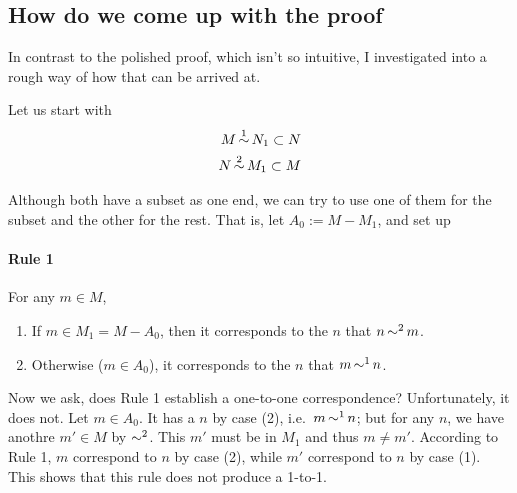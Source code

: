 \subsection{How do we come up with the proof}
In contrast to the polished proof, which isn't so intuitive, I investigated
into a rough way of how that can be arrived at.

Let us start with 
\begin{align*}
M \operatorname*{\sim}^1 N_1 \subset N \\
N \operatorname*{\sim}^2 M_1 \subset M
\end{align*}

Although both have a subset as one end, we can try to use one of them for the
subset and the other for the rest. That is, let $A_0 := M-M_1$, and set up

\paragraph{Rule 1}
For any $m \in M$,
\begin{enumerate}
	\item If $m \in M_1 = M-A_0$, then it corresponds to the $n$ that $n
		\operatorname*{\sim}^2 m$.
	\item Otherwise ($m \in A_0$), it corresponds to the $n$ that $m \operatorname*{\sim}^1
		n$.
\end{enumerate}

Now we ask, does Rule 1 establish a one-to-one correspondence? Unfortunately,
it does not. Let $m \in A_0$. It has a $n$ by case (2), i.e.\ $m \operatorname*{\sim}^1 n$;
but for any $n$, we have anothre $m' \in M$ by $\operatorname*{\sim}^2$. This $m'$ must be in
$M_1$ and thus $m \ne m'$. According to  Rule 1, $m$ correspond to $n$ by case
(2), while $m'$ correspond to $n$ by case (1). This shows that this rule does
not produce a 1-to-1.


